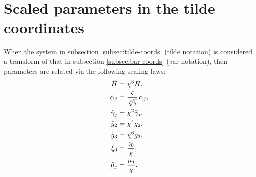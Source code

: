 \documentclass[11pt,a4paper]{article}
\numberwithin{equation}{section}
\begin{document}
\section{Scaled parameters in the tilde coordinates}
\label{app:scaled-params}
When the system in subsection \ref{subsec:tilde-coords} (tilde notation) is considered a transform of that in subsection \ref{subsec:bar-coords} (bar notation), then parameters are related via the following scaling laws:
\begin{align}
\tilde{H} &= \chi^3\bar{H}, \\
\tilde{\alpha}_j &= \frac{\varsigma}{\sqrt[4]{\varsigma}}\,\bar{\alpha}_j, \notag \\
\tilde{\gamma}_j &= \chi^2\bar{\gamma}_j, \notag \\
\tilde{g}_2 &= \chi^4 g_2, \notag \\
\tilde{g}_3 &= \chi^6 g_3, \notag \\
\xi_0 &= \frac{z_0}{\chi}, \notag \\
\tilde{\mu}_j &= \frac{\mu_j}{\chi}.
\end{align}
\end{document}
